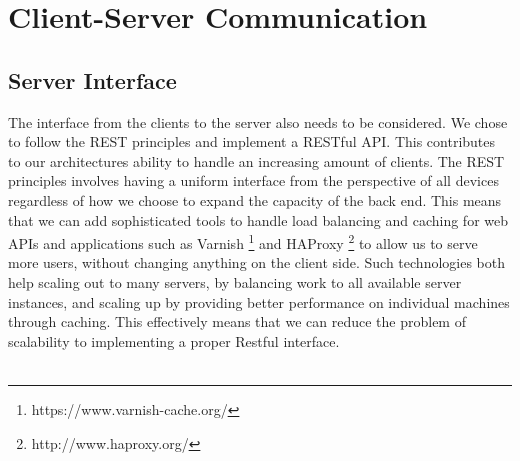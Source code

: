\section{Client-Server Communication}
\label{sec:client_server_interface}

\subsection{Server Interface}
\label{sub:server_interface}
The interface from the clients to the server also needs to be considered. We chose to follow the REST principles  and implement a RESTful API. This contributes to our architectures ability to handle an increasing amount of clients. The REST principles involves having a uniform interface from the perspective of all devices regardless of how we choose to expand the capacity of the back end. This means that we can add sophisticated tools to handle load balancing and caching for web APIs and applications such as Varnish \footnote{https://www.varnish-cache.org/} and HAProxy \footnote{http://www.haproxy.org/} to allow us to serve more users, without changing anything on the client side. Such technologies both help scaling out to many servers, by balancing work to all available server instances, and scaling up by providing better performance on individual machines through caching. This effectively means that we can reduce the problem of scalability to implementing a proper Restful interface. 
\\\\

